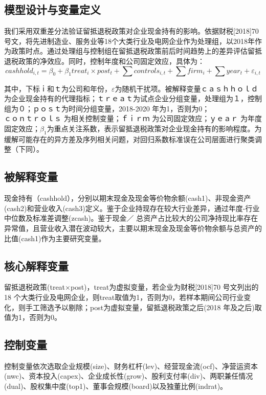 \documentclass{article}
\begin{document}
\subsection{模型设计与变量定义}
我们采用双重差分法验证留抵退税政策对企业现金持有的影响。依据财税[2018]70号文，将先进制造业、服务业等18个大类行业及电网企业作为处理组，以2018年作为政策时点。通过处理组与控制组在留抵退税政策前后时间趋势上的差异评估留抵退税政策的净效应。同时，控制年度和公司固定效应，具体为：
\begin{equation}
    cashhold _{i, t}=\beta_{0}+\beta_{1} treat _{i} \times post _{t}+\sum controls _{i, t}+\sum firm _{i}+\sum year _{t}+\varepsilon_{i, t}
\end{equation}

其中，下标ｉ和ｔ为公司和年份，$\varepsilon$为随机干扰项。被解释变量$ｃａｓｈｈｏｌｄ$ 为企业现金持有的代理指标；$ｔｒｅａｔ $为试点企业分组变量，处理组为１，控制组为０；$ｐｏｓｔ $为时间分组变量，2018-2020 年为1，否则为0；$ｃｏｎｔｒｏｌｓ$ 为相关控制变量；$ｆｉｒｍ$ 为公司固定效应；$ｙｅａｒ$ 为年度固定效应；$\beta_1$为重点关注系数，表示留抵退税政策对企业现金持有的影响程度。为缓解可能存在的异方差及序列相关问题，对回归系数标准误在公司层面进行聚类调整（下同）。

\subsection{被解释变量}
现金持有（cashhold），分别以期末现金及现金等价物余额(cash1)、非现金资产(cash2)和营业收入(cash3)定义。鉴于企业持现存在较大行业差异，通过年度-行业中位数及标准差调整(zcash)。鉴于现金／ 总资产占比较大的公司净持现比率存在异常值，且营业收入潜在波动较大，主要以期末现金及现金等价物余额与总资产的比值(cash1)作为主要研究变量。

\subsection{核心解释变量}
留抵退税政策(treat$\times$post)，treat为虚拟变量，若企业为财税[2018]70 号文列出的18 个大类行业及电网企业，则treat取值为1，否则为0，若样本期间公司行业变化，则手工筛选予以剔除；post为虚拟变量，留抵退税政策之后(2018 年及之后)取值为1，否则为0。

\subsection{控制变量}
控制变量依次选取企业规模(size)、财务杠杆(lev)、经营现金流(ocf)、净营运资本(nwc)、资本投入(capex)、企业成长性(grow)、股利支付率(div)、两职兼任情况(dual)、股权集中度(top1)、董事会规模(board)以及独董比例(indrat)。
\end{document}
